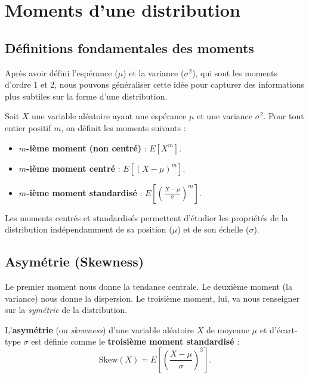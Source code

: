 \newpage

\section{Moments d'une distribution}

\subsection{Définitions fondamentales des moments}

Après avoir défini l'espérance ($\mu$) et la variance ($\sigma^2$), qui sont les moments d'ordre 1 et 2, nous pouvons généraliser cette idée pour capturer des informations plus subtiles sur la forme d'une distribution.

\begin{definitionbox}
Soit $X$ une variable aléatoire ayant une espérance $\mu$ et une variance $\sigma^2$. Pour tout entier positif $m$, on définit les moments suivants :
\begin{itemize}
    \item \textbf{$m$-ième moment (non centré)} : $E[X^m]$.
    \item \textbf{$m$-ième moment centré} : $E[(X - \mu)^m]$.
    \item \textbf{$m$-ième moment standardisé} : $E\left[\left(\frac{X - \mu}{\sigma}\right)^m\right]$.
\end{itemize}
Les moments centrés et standardisés permettent d'étudier les propriétés de la distribution indépendamment de sa position ($\mu$) et de son échelle ($\sigma$).
\end{definitionbox}

\subsection{Asymétrie (Skewness)}

Le premier moment nous donne la tendance centrale. Le deuxième moment (la variance) nous donne la dispersion. Le troisième moment, lui, va nous renseigner sur la \textit{symétrie} de la distribution.

\begin{definitionbox}
L'\textbf{asymétrie} (ou \textit{skewness}) d'une variable aléatoire $X$ de moyenne $\mu$ et d'écart-type $\sigma$ est définie comme le \textbf{troisième moment standardisé} :
$$ \text{Skew}(X) = E\left[ \left( \frac{X - \mu}{\sigma} \right)^3 \right]. $$
\end{definitionbox}

